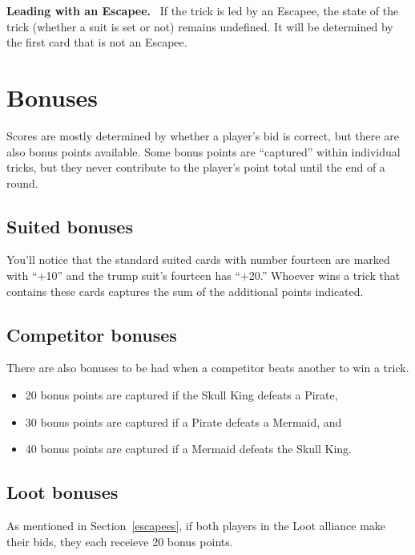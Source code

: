 \documentclass{article}
\newcommand{\block}[2][\medskip]{#1\noindent\textbf{#2.}\ }
\begin{document}
\block{Leading with an Escapee}
If the trick is led by an Escapee, the state of the trick (whether a suit is set or not) remains undefined.
It will be determined by the first card that is not an Escapee.

\section{Bonuses}\label{bonuses}
Scores are mostly determined by whether a player's bid is correct, but there are also bonus points available. Some bonus points are ``captured'' within individual tricks, but they never contribute to the player's point total until the end of a round.

\subsection{Suited bonuses}
You'll notice that the standard suited cards with number fourteen are marked with ``+10'' and the trump suit's fourteen has ``+20.''
Whoever wins a trick that contains these cards captures the sum of the additional points indicated.

\subsection{Competitor bonuses}
There are also bonuses to be had when a competitor beats another to win a trick.
\begin{itemize}
\item 20 bonus points are captured if the Skull King defeats a Pirate,
\item 30 bonus points are captured if a Pirate defeats a Mermaid, and
\item 40 bonus points are captured if a Mermaid defeats the Skull King.
\end{itemize}
\subsection{Loot bonuses}
As mentioned in Section~\ref{escapees}, if both players in the Loot alliance make their bids, they each receieve 20 bonus points.
\end{document}
